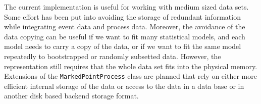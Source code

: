 \documentclass[11pt,a4paper,twoside]{article}
\begin{document}
The current implementation is useful for working with medium
sized data sets. Some effort has been put into avoiding the storage of
redundant information while integrating event data and process
data. Moreover, the avoidance of the data copying can be useful if we want to
fit many statistical models, and each model needs to carry a copy of
the data, or if we want to fit the same model repeatedly to bootstrapped or randomly
subsetted data. However, the representation still requires that the
whole data set fits into the physical memory. 
Extensions of the \verb+MarkedPointProcess+ class are planned that rely on
either more efficient internal storage of the data or access to the
data in a data base or in another disk based backend storage
format. 
\end{document}
